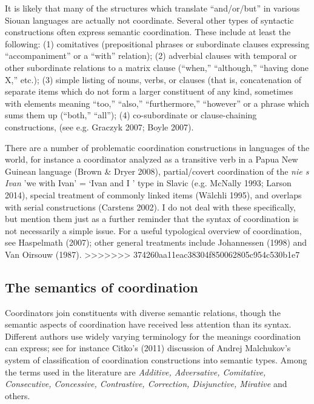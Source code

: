 \documentclass[output=paper]{LSP/langsci}
\begin{document}
It is likely that many of the structures which translate ``and/or/but'' in various Siouan languages are actually not coordinate. Several other types of syntactic constructions often express semantic coordination. These include at least the following: (1) comitatives (prepositional phrases or subordinate clauses expressing ``accompaniment'' or a ``with'' relation); (2) adverbial clauses with temporal or other subordinate relations to a matrix clause (``when,'' ``although,'' ``having done X,'' etc.); (3) simple listing of nouns, verbs, or clauses (that is, concatenation of separate items which do not form a larger constituent of any kind, sometimes with elements meaning ``too,'' ``also,'' ``furthermore,'' ``however'' or a phrase which sums them up (``both,'' ``all''); (4) co-subordinate or clause-chaining constructions, (see e.g. Graczyk 2007; Boyle 2007).

There are a number of problematic coordination constructions in languages of the world, for instance a coordinator analyzed as a transitive verb in a Papua New Guinean language (Brown \& Dryer 2008),  partial/covert coordination of the \textit{nie s Ivan} 'we with Ivan' = `Ivan and I ' type in Slavic (e.g. McNally 1993; Larson 2014), special treatment of commonly linked items (W\"alchli 1995), and overlaps with serial constructions (Carstens 2002). I do not deal with these specifically, but mention them just as a further reminder that the syntax of coordination is not necessarily a simple issue. For a useful typological overview of coordination, see Haspelmath (2007); other general treatments include Johannessen (1998) and Van Oirsouw (1987). 
>>>>>>> 374260aa11eac38304f850062805c954c530b1e7

\subsection{The semantics of coordination}

Coordinators join constituents with diverse semantic relations, though the semantic aspects of coordination have received less attention than its syntax. Different authors use widely varying terminology for the meanings coordination can express; see for instance Citko's (2011) discussion of Andrej Malchukov's system of classification of coordination constructions into semantic types. Among the terms used in the literature are \textit{Additive, Adversative, Comitative, Consecutive, Concessive, Contrastive, Correction, Disjunctive, Mirative} and others.
\end{document}
